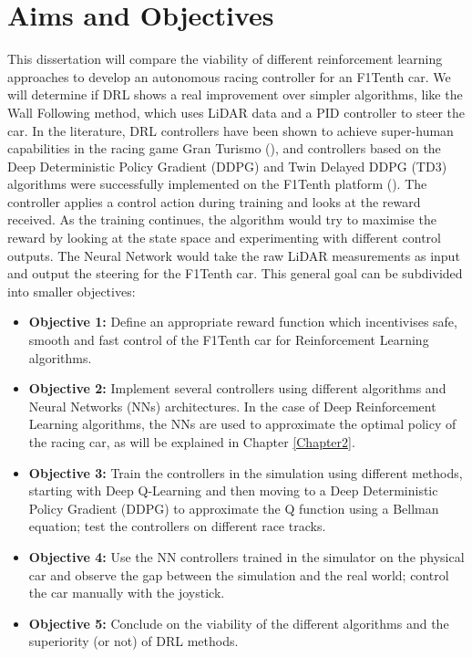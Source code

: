\section{Aims and Objectives}
\label{metricssection}

This dissertation will compare the viability of different reinforcement learning approaches to develop an autonomous racing controller for an F1Tenth car. We will determine if DRL shows a real improvement over simpler algorithms, like the Wall Following method, which uses LiDAR data and a PID controller to steer the car. In the literature, DRL controllers have been shown to achieve super-human capabilities in the racing game Gran Turismo (\cite{granturismo}), and controllers based on the Deep Deterministic Policy Gradient (DDPG) and Twin Delayed DDPG (TD3) algorithms were successfully implemented on the F1Tenth platform (\cite{Reference4}). The controller applies a control action during training and looks at the reward received. As the training continues, the algorithm would try to maximise the reward by looking at the state space and experimenting with different control outputs. The Neural Network would take the raw LiDAR measurements as input and output the steering for the F1Tenth car. This general goal can be subdivided into smaller objectives:

\begin{itemize}
\item \textbf{Objective 1:} Define an appropriate reward function which incentivises safe, smooth and fast control of the F1Tenth car for Reinforcement Learning algorithms.
\item \textbf{Objective 2:} Implement several controllers using different algorithms and Neural Networks (NNs) architectures. In the case of Deep Reinforcement Learning algorithms, the NNs are used to approximate the optimal policy of the racing car, as will be explained in Chapter \ref{Chapter2}.
\item \textbf{Objective 3:} Train the controllers in the simulation using different methods, starting with Deep Q-Learning and then moving to a Deep Deterministic Policy Gradient (DDPG) to approximate the Q function using a Bellman equation; test the controllers on different race tracks.
\item \textbf{Objective 4:} Use the NN controllers trained in the simulator on the physical car and observe the gap between the simulation and the real world; control the car manually with the joystick.
\item \textbf{Objective 5:} Conclude on the viability of the different algorithms and the superiority (or not) of DRL methods.
\end{itemize}

